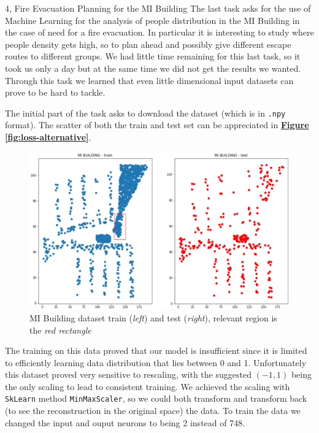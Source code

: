 \documentclass[10pt,a4paper]{article}
\begin{document}
\begin{task}{4, Fire Evacuation Planning for the MI Building}
The last task asks for the use of Machine Learning for the analysis of people distribution in the MI Building in the case of need for a fire evacuation. In particular it is interesting to study where people density gets high, so to plan ahead and possibly give different escape routes to different groups. We had little time remaining for this last task, so it took us only a day but at the same time we did not get the results we wanted. Through this task we learned that even little dimensional input datasets can prove to be hard to tackle.

The initial part of the task asks to download the dataset (which is in \texttt{.npy} format). The scatter of both the train and test set  can be appreciated in \textbf{\hyperref[fig:loss-alternative]{Figure \ref{fig:loss-alternative}}}.

\begin{figure}[H]
    \centering
    \includegraphics[scale=0.4]{images/mi_building.png}
    \caption{MI Building dataset train (\textit{left}) and test (\textit{right}), relevant region is the \textit{red rectangle}}
    \label{fig:alt-elbo}
\end{figure}

The training on this data proved that our model is insufficient since it is limited to efficiently learning data distribution that lies between 0 and 1. Unfortunately this dataset proved very sensitive to rescaling, with the suggested $(-1, 1)$ being the only scaling to lead to consistent training. We achieved the scaling with \texttt{SkLearn} method \texttt{MinMaxScaler}, so we could both transform and transform back (to see the reconstruction in the original space) the data. To train the data we changed the input and ouput neurons to being 2 instead of 748.


\end{task}
\end{document}
